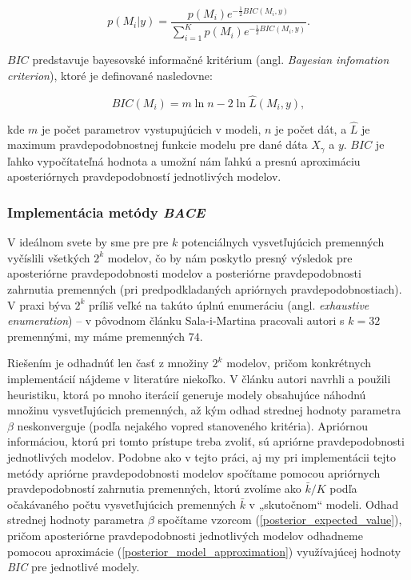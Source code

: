 \begin{equation} \label{posterior_model_approximation}
        p(M_i | y) = \frac{p(M_i) e^{-\frac{1}{2}BIC(M_i, y)}}{\sum_{i = 1}^{K} p(M_i) e^{-\frac{1}{2}BIC(M_i, y)}}.
\end{equation}

\(BIC\) predstavuje bayesovské informačné kritérium (angl. \emph{Bayesian infomation criterion}), ktoré je definované nasledovne:

\[
    BIC(M_i) = m \ln{n} - 2 \ln{\hat{L}(M_i, y)},
\]

kde \( m \) je počet parametrov vystupujúcich v modeli, \(n\) je počet dát,
a \(\hat{L}\) je maximum pravdepodobnostnej funkcie modelu pre dané dáta \(X_{\gamma}\) a \(y\).
\(BIC\) je ľahko vypočítateľná hodnota a umožní nám ľahkú a presnú aproximáciu aposteriórnych pravdepodobností jednotlivých modelov.

\subsubsection{Implementácia metódy \emph{BACE}}

V ideálnom svete by sme pre pre \(k\) potenciálnych vysvetľujúcich premenných vyčíslili všetkých \(2^k\) modelov,
čo by nám poskytlo presný výsledok pre aposteriórne pravdepodobnosti modelov a posteriórne pravdepodobnosti zahrnutia premenných (pri predpodkladaných apriórnych pravdepodobnostiach).
V praxi býva \(2^k\) príliš veľké na takúto úplnú enumeráciu (angl. \emph{exhaustive enumeration}) – v pôvodnom článku Sala-i-Martina pracovali autori s \(k = 32\) premennými, my máme premenných \(74\).

Riešením je odhadnúť len časť z množiny \(2^k\) modelov, pričom konkrétnych implementácií nájdeme v literatúre niekoľko.
V článku \cite{sala-i-martin} autori navrhli a použili heuristiku, ktorá po mnoho iterácií generuje modely obsahujúce náhodnú množinu vysvetľujúcich premenných,
až kým odhad strednej hodnoty parametra \(\beta\) neskonverguje (podľa nejakého vopred stanoveného kritéria).
Apriórnou informáciou, ktorú pri tomto prístupe treba zvoliť, sú apriórne pravdepodobnosti jednotlivých modelov.
Podobne ako v tejto práci, aj my pri implementácii tejto metódy apriórne pravdepodobnosti modelov spočítame pomocou apriórnych pravdepodobností zahrnutia premenných,
ktorú zvolíme ako \(\bar{k}/K\) podľa očakávaného počtu vysvetľujúcich premenných \(\bar{k}\) v „skutočnom“ modeli.
Odhad strednej hodnoty parametra \(\beta\) spočítame vzorcom (\ref{posterior_expected_value}),
pričom aposteriórne pravdepodobnosti jednotlivých modelov odhadneme pomocou aproximácie (\ref{posterior_model_approximation}) využívajúcej hodnoty \emph{BIC} pre jednotlivé modely.


